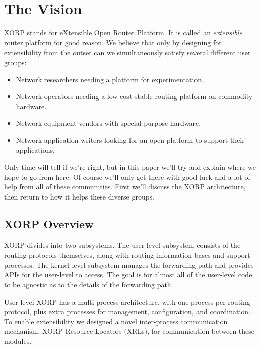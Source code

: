 \section{The Vision}

XORP stands for eXtensible Open Router Platform.  It is called an {\it
extensible} router platform for good reason.  We believe that only by
designing for extensibility from the outset can we simultaneously
satisfy several different user groups:
\begin{itemize}
\vspace{-0.07in}
\item Network researchers needing a platform for experimentation.
\vspace{-0.07in}
\item Network operators needing a low-cost stable routing platform on
commodity hardware.
\vspace{-0.07in}
\item Network equipment vendors with special purpose hardware.
\vspace{-0.07in}
\item Network application writers looking for an open platform to
support their applications.
\end{itemize}
\vspace{-0.05in}
Only time will tell if we're right, but in this paper we'll try and
explain where we hope to go from here.  Of course we'll only get there
with good luck and a lot of help from all of these communities.  First
we'll discuss the XORP architecture, then return to how it helps these
diverse groups.

\subsection{XORP Overview}

XORP divides into two subsystems. The user-level subsystem consists of the routing protocols themselves, along with routing
information bases and support processes. The kernel-level subsystem manages the forwarding path and provides APIs for the user-level to access. The goal is for almost all of the user-level code to be agnostic as to the details of the forwarding path.

User-level XORP has a multi-process architecture, with
one process per routing protocol, plus extra processes for management,
configuration, and coordination.  To enable extensibility we designed
a novel inter-process communication mechanism, XORP Resource
Locators (XRLs), for communication between these modules.  

